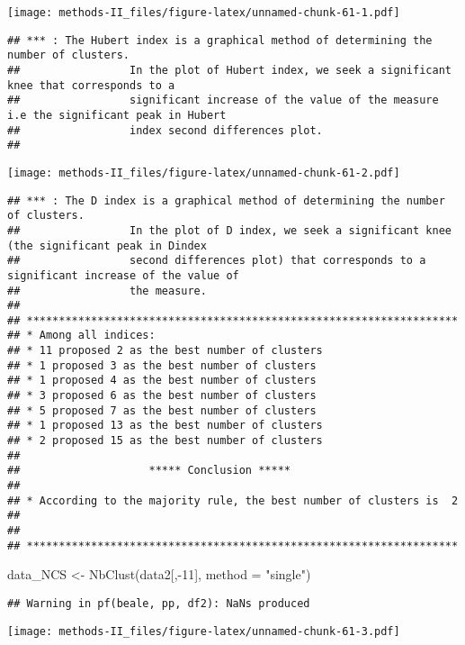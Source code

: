 \documentclass[
]{article}
\newenvironment{Shaded}{\begin{snugshade}}{\end{snugshade}}
\newcommand{\AttributeTok}[1]{\textcolor[rgb]{0.77,0.63,0.00}{#1}}
\newcommand{\DecValTok}[1]{\textcolor[rgb]{0.00,0.00,0.81}{#1}}
\newcommand{\FunctionTok}[1]{\textcolor[rgb]{0.00,0.00,0.00}{#1}}
\newcommand{\NormalTok}[1]{#1}
\newcommand{\OtherTok}[1]{\textcolor[rgb]{0.56,0.35,0.01}{#1}}
\newcommand{\SpecialCharTok}[1]{\textcolor[rgb]{0.00,0.00,0.00}{#1}}
\newcommand{\StringTok}[1]{\textcolor[rgb]{0.31,0.60,0.02}{#1}}
\begin{document}
\texttt{[image: methods-II\_files/figure-latex/unnamed-chunk-61-1.pdf]}

\begin{verbatim}
## *** : The Hubert index is a graphical method of determining the number of clusters.
##                 In the plot of Hubert index, we seek a significant knee that corresponds to a 
##                 significant increase of the value of the measure i.e the significant peak in Hubert
##                 index second differences plot. 
## 
\end{verbatim}

\texttt{[image: methods-II\_files/figure-latex/unnamed-chunk-61-2.pdf]}

\begin{verbatim}
## *** : The D index is a graphical method of determining the number of clusters. 
##                 In the plot of D index, we seek a significant knee (the significant peak in Dindex
##                 second differences plot) that corresponds to a significant increase of the value of
##                 the measure. 
##  
## ******************************************************************* 
## * Among all indices:                                                
## * 11 proposed 2 as the best number of clusters 
## * 1 proposed 3 as the best number of clusters 
## * 1 proposed 4 as the best number of clusters 
## * 3 proposed 6 as the best number of clusters 
## * 5 proposed 7 as the best number of clusters 
## * 1 proposed 13 as the best number of clusters 
## * 2 proposed 15 as the best number of clusters 
## 
##                    ***** Conclusion *****                            
##  
## * According to the majority rule, the best number of clusters is  2 
##  
##  
## *******************************************************************
\end{verbatim}

\begin{Shaded}
\begin{Highlighting}[]
\NormalTok{data\_NCS }\OtherTok{\textless{}{-}} \FunctionTok{NbClust}\NormalTok{(data2[,}\SpecialCharTok{{-}}\DecValTok{11}\NormalTok{], }\AttributeTok{method =} \StringTok{"single"}\NormalTok{)}
\end{Highlighting}
\end{Shaded}

\begin{verbatim}
## Warning in pf(beale, pp, df2): NaNs produced
\end{verbatim}

\texttt{[image: methods-II\_files/figure-latex/unnamed-chunk-61-3.pdf]}
\end{document}
